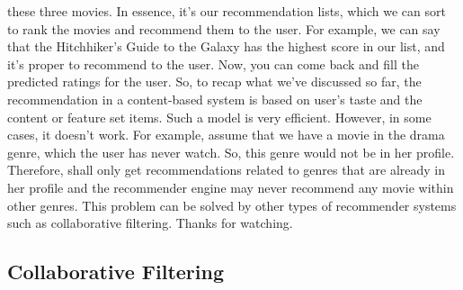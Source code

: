 these three movies. In essence, it's our recommendation lists, which we can sort to rank the movies and recommend them to the user. For example, we can say that the Hitchhiker's Guide to the Galaxy has the highest score in our list, and it's proper to recommend to the user. Now, you can come back and fill the predicted ratings for the user. So, to recap what we've discussed so far, the recommendation in a content-based system is based on user's taste and the content or feature set items. Such a model is very efficient. However, in some cases, it doesn't work. For example, assume that we have a movie in the drama genre, which the user has never watch. So, this genre would not be in her profile. Therefore, shall only get recommendations related to genres that are already in her profile and the recommender engine may never recommend any movie within other genres. This problem can be solved by other types of recommender systems such as collaborative filtering. Thanks for watching.
		
	\subsection{Collaborative Filtering}
	
